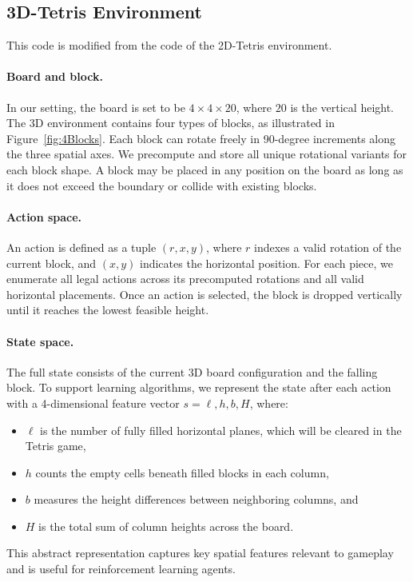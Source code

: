 \subsection{3D-Tetris Environment}

This code is modified from the code of the 2D-Tetris environment.

\paragraph{Board and block.}
In our setting, the board is set to be \(4 \times 4 \times 20\), where \(20\) is the vertical height. The 3D environment contains four types of blocks, as illustrated in Figure~\ref{fig:4Blocks}. Each block can rotate freely in 90-degree increments along the three spatial axes. We precompute and store all unique rotational variants for each block shape. A block may be placed in any position on the board as long as it does not exceed the boundary or collide with existing blocks.

\paragraph{Action space.}
An action is defined as a tuple \((r, x, y)\), where \(r\) indexes a valid rotation of the current block, and \((x, y)\) indicates the horizontal position. For each piece, we enumerate all legal actions across its precomputed rotations and all valid horizontal placements. Once an action is selected, the block is dropped vertically until it reaches the lowest feasible height.

\paragraph{State space.}
The full state consists of the current 3D board configuration and the falling block. To support learning algorithms, we represent the state after each action with a 4-dimensional feature vector \(s = \ell, h, b, H\), where:
\begin{itemize}
    \item \(\ell\) is the number of fully filled horizontal planes, which will be cleared in the Tetris game,
    \item \(h\) counts the empty cells beneath filled blocks in each column,
    \item \(b\) measures the height differences between neighboring columns, and
    \item \(H\) is the total sum of column heights across the board.
\end{itemize}
This abstract representation captures key spatial features relevant to gameplay and is useful for reinforcement learning agents.

